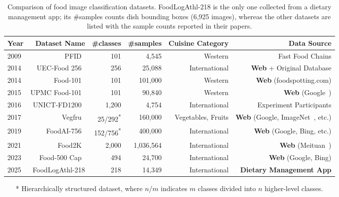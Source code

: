 \begin{table}[thb]
\centering
\caption{Comparison of food image classification datasets. FoodLogAthl-218 is the only one collected from a dietary management app; its \#samples counts dish bounding boxes (6,925 images), whereas the other datasets are listed with the sample counts reported in their papers.}
\begin{tabular}{@{}lrrrrr@{}}
\toprule
Year & Dataset Name & \#classes & \#samples & Cuisine Category & Data Source \\
\midrule
2009 & PFID~\cite{chen2009pfid} & 101 & 4,545 & Western & Fast Food Chains \\
2014 & UEC-Food 256~\cite{kawano2015automatic} & 256 & 25,088 & International & \textbf{Web} + Original Database \\
2014 & Food-101~\cite{bossard2014food} & 101 & 101,000 & Western & \textbf{Web} (foodspotting.com) \\
2015 & UPMC Food-101~\cite{wang2015recipe} & 101 & 90,840 & Western & \textbf{Web} (Google~\cite{google}) \\
2016 & UNICT-FD1200~\cite{farinella2016retrieval} & 1,200 & 4,754 & International & Experiment Participants \\
2017 & Vegfru~\cite{hou2017vegfru} & 25/292\textsuperscript{*} & 160,000 & Vegetables, Fruits & \textbf{Web} (Google, ImageNet~\cite{imagenet}, etc.) \\
2019 & FoodAI-756~\cite{sahoo2019foodai} & 152/756\textsuperscript{*} & 400,000 & International & \textbf{Web} (Google, Bing, etc.) \\
2021 & Food2K~\cite{min2023large} & 2,000 & 1,036,564 & International & \textbf{Web} (Meituan~\cite{meituan}) \\
2023 & Food-500 Cap~\cite{ma2023food} & 494 & 24,700 & International & \textbf{Web} (Google, Bing) \\
\midrule
2025 & FoodLogAthl-218 & 218 & 14,349 & International & \textbf{Dietary Management App} \\
\bottomrule
\end{tabular}
\label{tab:datasets}

\begin{itemize}[leftmargin=7.2em]
\setlength{\parskip}{0cm} \setlength{\itemsep}{0cm} \item[*] Hierarchically structured dataset, where $n$/$m$ indicates $m$ classes divided into $n$ higher-level classes.
\end{itemize}
\end{table}